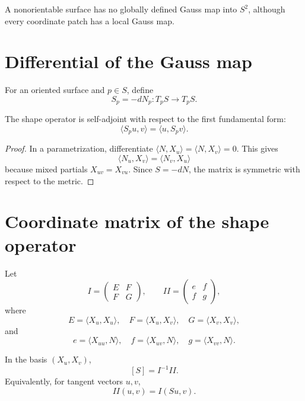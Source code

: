 \begin{warning}\label{warn:vii16-gauss-orientation}
A nonorientable surface has no globally defined Gauss map into \(S^2\), although every coordinate patch has a local Gauss map.
\end{warning}

\section{Differential of the Gauss map}

\begin{definition}\label{def:vii16-shape}
For an oriented surface and \(p\in S\), define
\[
S_p=-dN_p:T_pS\to T_pS.
\]
\end{definition}

\begin{theorem}\label{thm:vii16-self-adjoint}
The shape operator is self-adjoint with respect to the first fundamental form:
\[
\langle S_pu,v\rangle=\langle u,S_pv\rangle.
\]
\end{theorem}

\begin{proof}
In a parametrization, differentiate
\(\langle N,X_u\rangle=\langle N,X_v\rangle=0\). This gives
\[
\langle N_u,X_v\rangle=\langle N_v,X_u\rangle
\]
because mixed partials \(X_{uv}=X_{vu}\). Since \(S=-dN\), the matrix is symmetric with respect to the metric.
\end{proof}

\section{Coordinate matrix of the shape operator}

Let
\[
I=\begin{pmatrix}E&F\\F&G\end{pmatrix},
\qquad
II=\begin{pmatrix}e&f\\f&g\end{pmatrix},
\]
where
\[
E=\langle X_u,X_u\rangle,\quad F=\langle X_u,X_v\rangle,\quad
G=\langle X_v,X_v\rangle,
\]
and
\[
e=\langle X_{uu},N\rangle,\quad
f=\langle X_{uv},N\rangle,\quad
g=\langle X_{vv},N\rangle.
\]

\begin{theorem}\label{thm:vii16-matrix}
In the basis \((X_u,X_v)\),
\[
[S]=I^{-1}II.
\]
Equivalently, for tangent vectors \(u,v\),
\[
II(u,v)=I(Su,v).
\]
\end{theorem}

